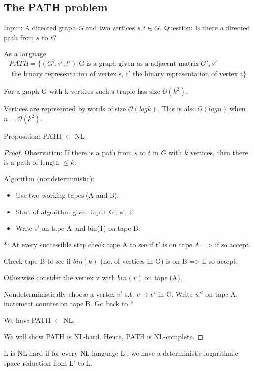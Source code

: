 \documentclass[a4paper,12pt]{article}
\theoremstyle{definition}
\theoremstyle{remark}
\begin{document}
\subsection{The PATH problem}
Input: A directed graph $G$ and two vertices $s, t \in G$.
Question: Is there a directed path from $s$ to $t$?

As a language
\begin{gather*}
    PATH = \{(G', s', t') | \text{G is a graph given as a adjacent matrix } G', s' \\
    \text{ the binary representation of vertex s, t' the binary representation of vertex t}\}
\end{gather*}

For a graph G with k vertices such a truple has size $\mathscr{O}(k^2)$.

Vertices are represented by words of size $\mathscr{O}(log k)$. This is also $\mathscr{O}(log n)$ when $n = \mathscr{O}(k^2)$.

Proposition: PATH $\in$ NL.

\begin{proof}
    Observation: If there is a path from $s$ to $t$ in $G$ with $k$ vertices, then there is a path of length $ \leq k$.

    Algorithm (nondeterministic):
    \begin{itemize}
        \item Use two working tapes (A and B).
        \item Start of algorithm given input G', s', t' 
        \item Write s' on tape A and bin(1) on tape B.
    \end{itemize}

    *: At every successible step check tape A to see if t' is on tape A => if so accept.

    Check tape B to see if $bin(k)$ (no. of vertices in G) is on B => if so accept.

    Otherwise consider the vertex v with $bin(v)$ on tape (A).

    Nondeterministically choose a vertex $v'$ s.t. $v \to v'$ in G. Write $w''$ on tape A. increment counter on tape B. Go back to *

    We have PATH $\in$ NL.

    We will show PATH is NL-hard. Hence, PATH is NL-complete.
\end{proof}

L is NL-hard if for every NL language L', we have a deterministic logarithmic space reduction from L' to L.
\end{document}
